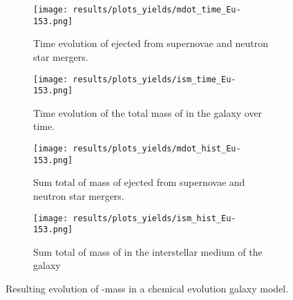 \begin{figure}
  \begin{subfigure}{\subfigwidth}
    \centering
    \texttt{[image: results/plots\_yields/mdot\_time\_Eu-153.png]}
    \caption{Time evolution of  ejected from supernovae and neutron star mergers.}
  \end{subfigure}
  \begin{subfigure}{\subfigwidth}
    \centering
    \texttt{[image: results/plots\_yields/ism\_time\_Eu-153.png]}
    \caption{Time evolution of the total mass of  in the galaxy over time.}
  \end{subfigure}
  \begin{subfigure}{\subfigwidth}
    \centering
    \texttt{[image: results/plots\_yields/mdot\_hist\_Eu-153.png]}
    \caption{Sum total of mass of  ejected from supernovae and neutron star mergers.}
  \end{subfigure}
  \begin{subfigure}{\subfigwidth}
    \centering
    \texttt{[image: results/plots\_yields/ism\_hist\_Eu-153.png]}
    \caption{Sum total of mass of  in the interstellar medium of the galaxy}
  \end{subfigure}
  \caption{Resulting evolution of -mass in a chemical evolution galaxy model.}
\end{figure}
\begin{table}

\end{table}

